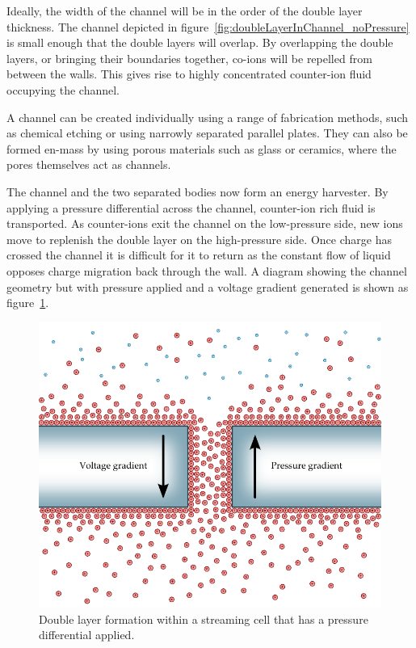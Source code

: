   Ideally, the width of the channel will be in the order of the double layer thickness.
  The channel depicted in figure~\ref{fig:doubleLayerInChannel_noPressure} is small enough that the double layers will overlap.
  By overlapping the double layers, or bringing their boundaries together, co-ions will be repelled from between the walls.
  This gives rise to highly concentrated counter-ion fluid occupying the channel.

  A channel can be created individually using a range of fabrication methods, such as chemical etching or using narrowly separated parallel plates.
  They can also be formed en-mass by using porous materials such as glass or ceramics, where the pores themselves act as channels.

  The channel and the two separated bodies now form an energy harvester.
  By applying a pressure differential across the channel, counter-ion rich fluid is transported.
  As counter-ions exit the channel on the low-pressure side, new ions move to replenish the double layer on the high-pressure side.
  Once charge has crossed the channel it is difficult for it to return as the constant flow of liquid opposes charge migration back through the wall.
  A diagram showing the channel geometry but with pressure applied and a voltage gradient generated is shown as figure~\ref{fig:doubleLayerInChannel_withPressure}.

  \begin{figure}[ht]
      \centering
      \includegraphics{content/pt1/01-PowerHarvesting/graphics/intro_2_channel}
      \caption{\label{fig:doubleLayerInChannel_withPressure}Double layer formation within a streaming cell that has a pressure differential applied.}
  \end{figure}

